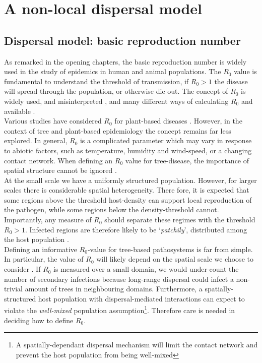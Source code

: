 \chapter{A non-local dispersal model}

\section{Dispersal model: basic reproduction number}

As remarked in the opening chapters, the basic reproduction number is widely used in the %
study of epidemics in human and animal populations. %
The $R_0$ value is fundamental to understand the threshold of transmission, if $R_0>1$ the %
disease will spread through the population, or otherwise die out. The concept of $R_0$ is %
widely used, and misinterpreted \cite{delamater2019complexity}, and many different ways of %
calculating $R_0$ and available \cite{perspectives-on-r0}.\\

Various studies have considered $R_0$ for plant-based diseases %
\cite{gubbins2000population, park2001invasion, doi:10.1146/annurev.phyto.011108.135838, van2011periodic, mikaberidze2016invasiveness}. %
However, in the context of tree and plant-based epidemiology the concept remains far less %
explored. In general, $R_0$ is a complicated parameter which may vary in response to abiotic %
factors, such as temperature, humidity and wind-speed, or a changing contact network. %
When defining an $R_0$ value for tree-disease, the importance of spatial structure cannot be %
ignored \cite{park2001invasion}.\\

At the small scale we have a uniformly structured population. %
However, for larger scales there is considerable spatial heterogeneity. %
There fore, it is expected that some regions above the threshold host-density can support %
local reproduction of the pathogen, while some regions below the density-threshold cannot. %
Importantly, any measure of $R_0$ should separate these regimes with the threshold $R_0>1$. %
Infected regions are therefore likely to be `\textit{patchily}', distributed among the host %
population \cite{park2001invasion}.\\

Defining an informative $R_0$-value for tree-based pathosystems is far from simple. %
In particular, the value of $R_0$ will likely depend on the spatial scale we choose to %
consider \cite{mikaberidze2016invasiveness}. %
If  $R_0$ is measured over a small domain, we would under-count the number of secondary %
infections because long-range dispersal could infect a non-trivial amount of trees in %
neighbouring domains. %
Furthermore, a spatially-structured host population with dispersal-mediated interactions %
can expect to violate the \textit{well-mixed} population assumption\footnote{A spatially-dependant dispersal mechanism will limit the contact network and prevent the host population from being well-mixed}. 
Therefore care is needed in deciding how to define $R_0$.\\


